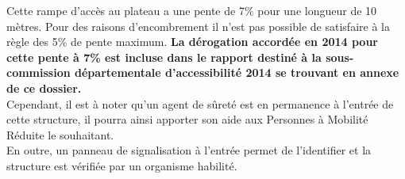 \documentclass[hidelinks, paper=a4, fontsize=13pt]{report}
\begin{document}
Cette rampe d’accès au plateau a une pente de 7\% pour une longueur de 10 mètres. Pour des raisons d’encombrement il n’est pas possible de satisfaire à la règle des 5\% de pente maximum. \textbf{La dérogation accordée en 2014 pour cette pente à 7\% est incluse dans le rapport destiné à la sous-commission départementale d’accessibilité 2014 se trouvant en annexe de ce dossier.}\\

Cependant, il est à noter qu’un agent de sûreté est en permanence à l’entrée de cette structure, il pourra ainsi apporter son aide aux Personnes à Mobilité Réduite le souhaitant.\\

En outre, un panneau de signalisation à l’entrée permet de l’identifier et la structure est vérifiée par un organisme habilité.
\end{document}
